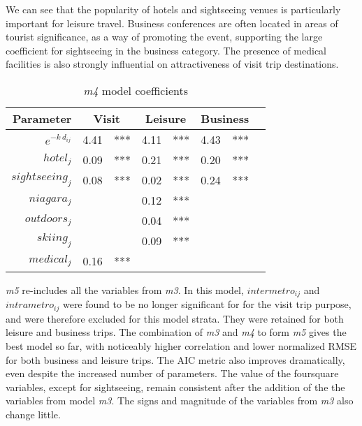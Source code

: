 We can see that the popularity of hotels and sightseeing venues is particularly important for leisure travel. Business conferences are often located in areas of tourist significance, as a way of promoting the event, supporting the large coefficient for sightseeing in the business category. The presence of medical facilities is also strongly influential on attractiveness of visit trip destinations. 


\begin{table}[H]
\centering
\caption{\textit{m4} model coefficients}
\label{table:m4-coeff}
\begin{tabular}{@{}rlrlrlrl@{}}
  \toprule
 Parameter & \multicolumn{2}{c}{Visit} & \multicolumn{2}{c}{Leisure} & \multicolumn{2}{c}{Business} &  \\ \midrule
  $e^{-k\ d_{ij}}$  & 4.41 & *** & 4.11 & *** & 4.43 & *** \\ 
  $hotel_j$ & 0.09 & *** & 0.21 & *** & 0.20 & *** \\ 
  $sightseeing_j$ & 0.08 & *** & 0.02 & *** & 0.24 & *** \\ 
  $niagara_j$  &  &  & 0.12 & *** &  &  \\ 
  $outdoors_j$  &  &  & 0.04 & *** &  &  \\ 
  $skiing_j$   &  &  & 0.09 & *** &  &  \\ 
  $medical_j$  & 0.16 & *** &  &  &  &  \\ 
   \bottomrule
\end{tabular}
\end{table}

\textit{m5} re-includes all the variables from \textit{m3}. In this model, $intermetro_{ij}$ and $intrametro_{ij}$ were found to be no longer significant for for the visit trip purpose, and were therefore excluded for this model strata. They were retained for both leisure and business trips. The combination of \textit{m3} and \textit{m4} to form \textit{m5} gives the best model so far, with noticeably higher correlation and lower normalized RMSE for both business and leisure trips. The AIC metric also improves dramatically, even despite the increased number of parameters. The value of the foursquare variables, except for sightseeing, remain consistent after the addition of the the variables from model \textit{m3}. The signs and magnitude of the variables from \textit{m3} also change little.

